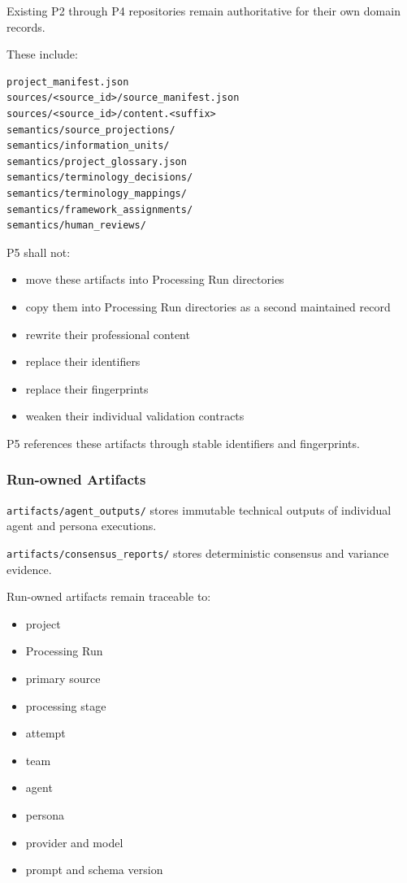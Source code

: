 Existing P2 through P4 repositories remain authoritative for their own domain records.

These include:

\begin{verbatim}
project_manifest.json
sources/<source_id>/source_manifest.json
sources/<source_id>/content.<suffix>
semantics/source_projections/
semantics/information_units/
semantics/project_glossary.json
semantics/terminology_decisions/
semantics/terminology_mappings/
semantics/framework_assignments/
semantics/human_reviews/
\end{verbatim}

P5 shall not:

\begin{itemize}
\tightlist
\item
  move these artifacts into Processing Run directories
\item
  copy them into Processing Run directories as a second maintained record
\item
  rewrite their professional content
\item
  replace their identifiers
\item
  replace their fingerprints
\item
  weaken their individual validation contracts
\end{itemize}

P5 references these artifacts through stable identifiers and fingerprints.

\hypertarget{run-owned-artifacts}{%
\subsubsection{Run-owned Artifacts}\label{run-owned-artifacts}}

\texttt{artifacts/agent\_outputs/} stores immutable technical outputs of individual agent and persona executions.

\texttt{artifacts/consensus\_reports/} stores deterministic consensus and variance evidence.

Run-owned artifacts remain traceable to:

\begin{itemize}
\tightlist
\item
  project
\item
  Processing Run
\item
  primary source
\item
  processing stage
\item
  attempt
\item
  team
\item
  agent
\item
  persona
\item
  provider and model
\item
  prompt and schema version
\end{itemize}

